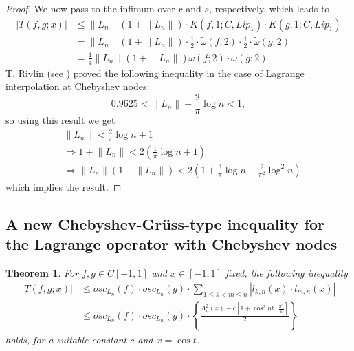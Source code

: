 \documentclass[12pt,leqno,a4paper,dvips,twoside]{article}
\newtheorem{thm}{Theorem}[section]
\begin{document}
{\begin{proof}
We now pass to the infimum over $r$ and $s$, respectively, which leads to
	\begin{align*}
		\left|T(f,g;x)\right|
		&\leq \left\|L_n\right\|(1+\left\|L_n\right\|)\cdot K(f,1;C,Lip_1)\cdot K(g,1;C,Lip_1)\\
		&=\left\|L_n\right\|(1+\left\|L_n\right\|)\cdot\frac{1}{2}\cdot \widetilde{\omega}(f;2)\cdot\frac{1}{2}\cdot\widetilde{\omega}(g;2)\\
		&=\frac{1}{4}\left\|L_n\right\|(1+\left\|L_n\right\|)\omega(f;2)\cdot\omega(g;2).
	\end{align*}
	T. Rivlin (see \cite{rivlin:1981}) proved the following inequality in the case of Lagrange interpolation at Chebyshev nodes:	
	\begin{equation*}
		0.9625<\left\|L_n\right\|-\frac{2}{\pi}\log n<1,
	\end{equation*}
  so using this result we get
		\begin{align*}
			&\left\|L_n\right\|<\frac{2}{\pi}\log n+1\\
			&\Rightarrow 1+\left\|L_n\right\|<2\left(\frac{1}{\pi}\log n+1\right)\\
			&\Rightarrow \left\|L_n\right\|(1+\left\|L_n\right\|)< 2\left(1+\frac{3}{\pi}\log n+\frac{2}{\pi^2}\log^2 n\right)
		\end{align*}
	which implies the result. 
\end{proof}

\subsection{A new Chebyshev-Gr\"{u}ss-type inequality for the Lagrange operator with Chebyshev nodes}

\begin{thm}
For $f,g\in C[-1,1]$ and $x\in [-1,1]$ fixed, the following inequality
		\begin{align*}
	\left| T(f,g;x)\right|
	&\leq osc_{L_n}(f)\cdot osc_{L_n}(g)\cdot \sum_{1\leq k<m\leq n}{\left|l_{k,n}(x)\cdot l_{m,n}(x)\right|}\\
&\leq osc_{L_n}(f)\cdot osc_{L_n}(g)\cdot \left\{\frac{\Lambda^2_n(x)-c\left[1+\cos^{2}nt\cdot\frac{\pi^2}{6}\right]}{2}\right\}
		\end{align*}
holds, for a suitable constant $c$ and $x=\cos t$. 
\end{thm}

}
\end{document}
